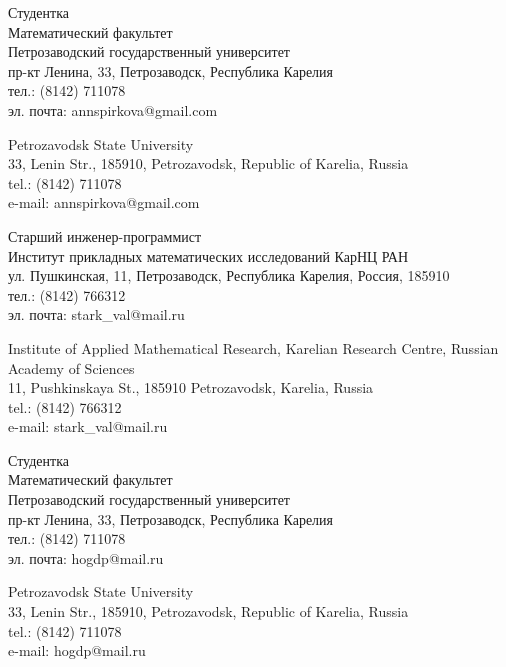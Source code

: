 \documentclass{article}
\begin{document}
\begin{aboutauthors}
Студентка\\
Математический факультет\\ 
Петрозаводский государственный университет\\
пр-кт Ленина, 33, Петрозаводск, Республика Карелия\\
тел.: (8142) 711078\\
эл. почта: annspirkova@gmail.com

\columnbreak

Petrozavodsk State University\\
33, Lenin Str., 185910, Petrozavodsk, Republic of Karelia, Russia\\
tel.: (8142) 711078\\
e-mail: annspirkova@gmail.com
\end{aboutauthors}

\begin{aboutauthors}
Старший инженер-программист\\ 
Институт прикладных математических исследований КарНЦ РАН\\ 
ул. Пушкинская, 11, Петрозаводск, Республика Карелия, Россия, 185910\\
тел.: (8142) 766312\\
эл. почта: stark\_val@mail.ru

\columnbreak

Institute of Applied Mathematical Research, Karelian Research Centre, Russian Academy of Sciences\\
11, Pushkinskaya St., 185910 Petrozavodsk, Karelia, Russia\\
tel.: (8142) 766312\\
e-mail: stark\_val@mail.ru 
\end{aboutauthors}

\begin{aboutauthors}
Студентка\\
Математический факультет\\ 
Петрозаводский государственный университет\\
пр-кт Ленина, 33, Петрозаводск, Республика Карелия\\
тел.: (8142) 711078\\
эл. почта: hogdp@mail.ru

\columnbreak

Petrozavodsk State University\\
33, Lenin Str., 185910, Petrozavodsk, Republic of Karelia, Russia\\
tel.: (8142) 711078\\
e-mail: hogdp@mail.ru
\end{aboutauthors}
\end{document}
